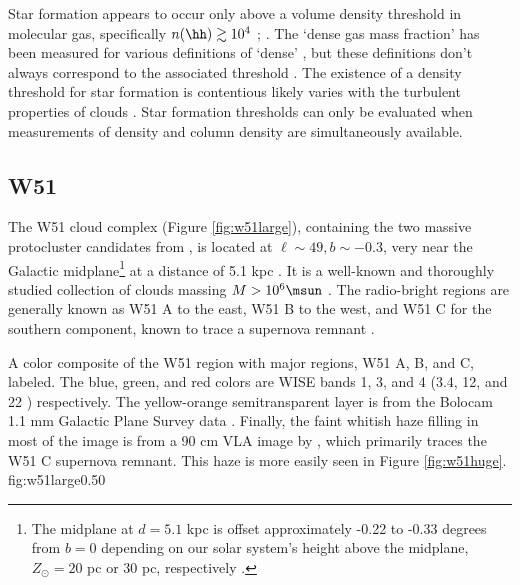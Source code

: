 Star formation appears to occur  only above a volume
density threshold in molecular gas, specifically $n(\hh)\gtrsim10^4$ \percc
\citep[][who advocate a
column density threshold corresponding to this density]{Lada2010a}; .  The `dense
gas mass fraction' has been measured for various definitions of `dense'
\citep{Battisti2014a,Wu2005a}, but these definitions don't always correspond to
the associated threshold
\citep{Kauffmann2010a,Parmentier2011a,Parmentier2011b}.  
The existence of a  
density threshold for star formation is contentious
\citep{Burkert2012a,Clark2013b} likely
varies with the turbulent properties of clouds
\citep{Longmore2013b,Hennebelle2011a,Hennebelle2013a}.  Star
formation thresholds can only be evaluated when measurements of density and
column density are simultaneously available.  

\subsection{W51}
The W51 cloud complex (Figure \ref{fig:w51large}), containing the two 
massive protocluster candidates  from
\citet{Ginsburg2012a}, is located at
$\ell\sim49, b\sim-0.3$, very near the Galactic midplane\footnote{The midplane
at $d=5.1$ kpc is offset approximately -0.22 to -0.33 degrees from $b=0$
depending on our solar system's height above the midplane, $Z_\odot = 20$ pc or
30 pc, respectively \citep{Reed2006a,Joshi2007a}.} at a distance of 5.1 kpc
\citep{Sato2010a}.  It is a well-known and thoroughly studied collection of
clouds massing $M>10^6 \msun$
\citep{Carpenter1998a,Bieging2010a,Kang2010a,Parsons2012a}.  The radio-bright
regions are generally known as W51 A to the east, W51 B to the west, and W51 C
for the southern component, known to trace a supernova remnant
\citep{Koo1995a,Brogan2000a,Brogan2013a}.

{A color composite of the W51 region with major regions, W51 A, B, and C,
labeled.    The
blue, green, and red colors are WISE bands 1, 3, and 4 (3.4, 12,
and 22 \um) respectively.  The yellow-orange semitransparent layer is from the
Bolocam 1.1 mm Galactic Plane Survey data \citep{Aguirre2011a,Ginsburg2013a}.
Finally, the faint whitish haze filling in most of the image is from a 90 cm
VLA image by \citet{Brogan2013a}, which primarily traces the W51 C supernova
remnant.  This haze is more easily seen in Figure \ref{fig:w51huge}.}
{fig:w51large}{0.5}{0}


